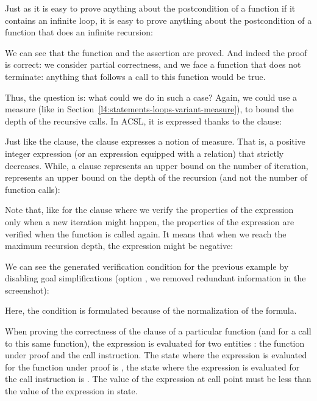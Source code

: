 Just as it is easy to prove anything about the postcondition of a function if it
contains an infinite loop, it is easy to prove anything about the postcondition
of a function that does an infinite recursion:






We can see that the function and the assertion are proved. And indeed the
proof is correct: we consider partial correctness, and we face a function
that does not terminate: anything that follows a call to this function would
be true.


Thus, the question is: what could we do in such a case? Again, we could use
a measure (like in Section~\ref{l4:statements-loops-variant-measure}), to
bound the depth of the recursive calls. In ACSL, it is expressed thanks to the
 clause:




Just like the  clause, the 
clause expresses a notion of measure. That is, a positive integer expression
(or an expression equipped with a relation) that strictly decreases. While, a
 clause represents an upper bound on the number of
iteration,  represents an upper bound on the depth of the
recursion (and not the number of function calls):




Note that, like for the  clause where we verify the
properties of the expression only when a new iteration might happen, the
properties of the  expression are verified when the
function is called again. It means that when we reach the maximum recursion
depth, the expression might be negative:




We can see the generated verification condition for the previous example by
disabling goal simplifications (option , we removed
redundant information in the screenshot):



Here, the condition  is formulated
 because of the normalization of the
formula.


When proving the correctness of the  clause of a particular
function (and for a call to this same function), the expression is evaluated
for two entities : the function under proof and the call instruction. The state
where the expression is evaluated for the function under proof is
, the state where the expression is evaluated for the call
instruction is . The value of the expression at call point must
be less than the value of the expression in  state.


